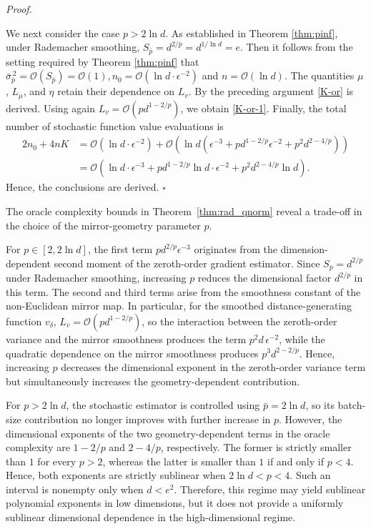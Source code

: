 \documentclass[11pt]{article}
\newenvironment{proof}[1][Proof]{%
    \par\noindent\textit{#1.}\enspace
  }{%
    \hfill\ensuremath{\square}\par
  }%
\numberwithin{equation}{section}
\begin{document}
\begin{proof}
We next consider the case \(p>2\ln d\). As established in Theorem \ref{thm:pinf},  under Rademacher smoothing,
\(S_{\bar p}=d^{2/\bar p}=d^{1/\ln d}=e\). Then it follows from the setting required by Theorem \ref{thm:pinf} that
\(\bar\sigma_{\bar p}^{\,2}
=\mathcal O(S_{\bar p})=\mathcal O(1), n_0=\mathcal O(\ln d\cdot\epsilon^{-2})\) and
\(n=\mathcal O(\ln d)\).
The quantities
\(\mu\), \(L_\mu\), and \(\eta\) retain their dependence on  \(L_v\). By the preceding argument \eqref{K-or} is derived. 
Using again \(L_v=\mathcal O(p d^{1-2/p})\), we obtain \eqref{K-or-1}. 
Finally,  the total number of stochastic function value evaluations is 
\[
\begin{aligned}
2n_0+4nK
&=
\mathcal O(
    \ln d\cdot\epsilon^{-2}
)
+
\mathcal O(
    \ln d
    (
        \epsilon^{-3}
        +p d^{1-2/p}\epsilon^{-2}
        +p^2d^{2-4/p}
    )
)                                                     \\
&=
\mathcal O(
    \ln d\cdot\epsilon^{-3}
    +p d^{1-2/p}\ln d\cdot\epsilon^{-2}
    +p^2d^{2-4/p}\ln d
).
\end{aligned}
\]
Hence, the conclusions are derived.
\end{proof}


The oracle complexity bounds in Theorem~\ref{thm:rad_qnorm}
reveal a trade-off in the choice of the mirror-geometry parameter
\(p\). 

For \(p\in[2,2\ln d]\), 
the first term \(p d^{2/p}\epsilon^{-3}\) originates from the dimension-dependent second moment
of the zeroth-order gradient estimator. Since
\(S_p=d^{2/p}\) under Rademacher smoothing, increasing \(p\)
reduces the dimensional factor \(d^{2/p}\) in this term.
The second and third terms arise from the smoothness constant of the
non-Euclidean mirror map. In particular, for the smoothed
distance-generating function \(v_\delta\),
\(L_v=\mathcal O(p d^{1-2/p})\), so the interaction between the
zeroth-order variance and the mirror smoothness produces the term
\(p^2d\,\epsilon^{-2}\), while the quadratic dependence on the
mirror smoothness produces \(p^3d^{2-2/p}\).
Hence, increasing \(p\) decreases the dimensional exponent in the
zeroth-order variance term but simultaneously increases the
geometry-dependent contribution.

For \(p>2\ln d\), the stochastic estimator is controlled using
\(\bar p=2\ln d\), so its batch-size contribution no longer improves
with further increase in \(p\). However, the dimensional exponents of the two geometry-dependent terms in the oracle complexity are \(1-2/p\) and \(2-4/p\),
respectively. The former is strictly smaller than \(1\) for every
\(p>2\), whereas the latter is smaller than \(1\) if and only if
\(p<4\). Hence, both exponents are strictly sublinear when
\(2\ln d<p<4.\)
Such an interval is nonempty only when \(d<e^2\). Therefore, this
regime may yield sublinear polynomial exponents in low dimensions,
but it does not provide a uniformly sublinear dimensional dependence
in the high-dimensional regime.
\end{document}
